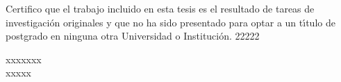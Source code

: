 


\setcounter{tocdepth}{5}



%

%

\renewcommand{\tablename}{Tabla}
\renewcommand{\listtablename}{{\'I}ndice de tablas}


\thispagestyle{empty}%
Certifico que el trabajo incluido en esta tesis es el resultado de tareas de investigaci{\'o}n originales y que no ha sido presentado para optar a un t{\'\i}tulo de postgrado en ninguna otra
Universidad o Instituci{\'o}n. 22222\\
\vspace{0.5cm}
\begin{flushright}
\large{}\selectfont
xxxxxxx\\
\normalsize\sffamily
xxxxx
\end{flushright}

%

%

%
%
    
\tableofcontents


\renewcommand{\baselinestretch}{1.2} %


